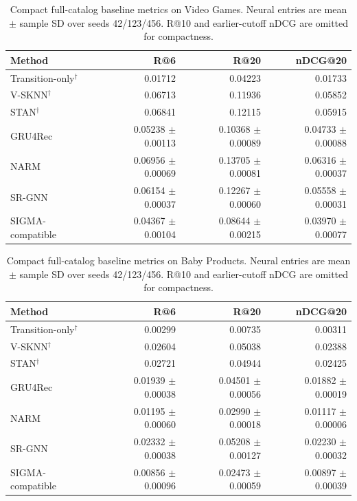 \begin{table}[h]
\caption{Compact full-catalog baseline metrics on Video Games. Neural entries are mean $\pm$ sample SD over seeds 42/123/456. R@10 and earlier-cutoff nDCG are omitted for compactness.}
\centering\scriptsize
\begin{tabular}{lrrr}
\toprule
Method & R@6 & R@20 & nDCG@20\\
\midrule
Transition-only$^\dagger$ & 0.01712 & 0.04223 & 0.01733\\
V-SKNN$^\dagger$ & 0.06713 & 0.11936 & 0.05852\\
STAN$^\dagger$ & 0.06841 & 0.12115 & 0.05915\\
GRU4Rec & 0.05238 $\pm$ 0.00113 & 0.10368 $\pm$ 0.00089 & 0.04733 $\pm$ 0.00088\\
NARM & 0.06956 $\pm$ 0.00069 & 0.13705 $\pm$ 0.00081 & 0.06316 $\pm$ 0.00037\\
SR-GNN & 0.06154 $\pm$ 0.00037 & 0.12267 $\pm$ 0.00060 & 0.05558 $\pm$ 0.00031\\
SIGMA-compatible & 0.04367 $\pm$ 0.00104 & 0.08644 $\pm$ 0.00215 & 0.03970 $\pm$ 0.00077\\
\bottomrule
\end{tabular}
\end{table}

\begin{table}[h]
\caption{Compact full-catalog baseline metrics on Baby Products. Neural entries are mean $\pm$ sample SD over seeds 42/123/456. R@10 and earlier-cutoff nDCG are omitted for compactness.}
\centering\scriptsize
\begin{tabular}{lrrr}
\toprule
Method & R@6 & R@20 & nDCG@20\\
\midrule
Transition-only$^\dagger$ & 0.00299 & 0.00735 & 0.00311\\
V-SKNN$^\dagger$ & 0.02604 & 0.05038 & 0.02388\\
STAN$^\dagger$ & 0.02721 & 0.04944 & 0.02425\\
GRU4Rec & 0.01939 $\pm$ 0.00038 & 0.04501 $\pm$ 0.00056 & 0.01882 $\pm$ 0.00019\\
NARM & 0.01195 $\pm$ 0.00060 & 0.02990 $\pm$ 0.00018 & 0.01117 $\pm$ 0.00006\\
SR-GNN & 0.02332 $\pm$ 0.00038 & 0.05208 $\pm$ 0.00127 & 0.02230 $\pm$ 0.00032\\
SIGMA-compatible & 0.00856 $\pm$ 0.00096 & 0.02473 $\pm$ 0.00059 & 0.00897 $\pm$ 0.00039\\
\bottomrule
\end{tabular}
\end{table}

